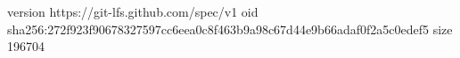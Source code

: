version https://git-lfs.github.com/spec/v1
oid sha256:272f923f90678327597cc6eea0c8f463b9a98c67d44e9b66adaf0f2a5c0edef5
size 196704
